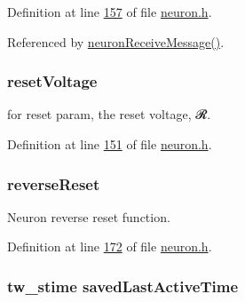 Definition at line \hyperlink{neuron_8h_source_l00157}{157} of file \hyperlink{neuron_8h_source}{neuron.\+h}.



Referenced by \hyperlink{neuron_8c_source_l00104}{neuron\+Receive\+Message()}.

\hypertarget{structneuron_state_af69a2c108fe9e7154fa047ea5acc5d80}{}
\subsubsection[{reset\+Voltage}]{ reset\+Voltage}\label{structneuron_state_af69a2c108fe9e7154fa047ea5acc5d80}


for reset param, the reset voltage, 𝓡. 



Definition at line \hyperlink{neuron_8h_source_l00151}{151} of file \hyperlink{neuron_8h_source}{neuron.\+h}.

\hypertarget{structneuron_state_abf6970098695585c81e101b2a741b9a5}{}
\subsubsection[{reverse\+Reset}]{ reverse\+Reset}\label{structneuron_state_abf6970098695585c81e101b2a741b9a5}


Neuron reverse reset function. 



Definition at line \hyperlink{neuron_8h_source_l00172}{172} of file \hyperlink{neuron_8h_source}{neuron.\+h}.

\hypertarget{structneuron_state_a6922b3f3041346eb83cfc6352a22277b}{}
\subsubsection[{saved\+Last\+Active\+Time}]{\setlength{\rightskip}{0pt plus 5cm}tw\+\_\+stime saved\+Last\+Active\+Time}\label{structneuron_state_a6922b3f3041346eb83cfc6352a22277b}


